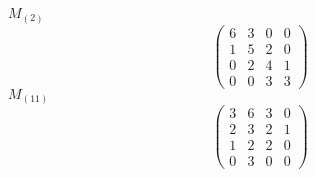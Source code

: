 \documentclass[12pt,reqno]{amsart}
\begin{document}
\Large
$M_{(2)}$                             $$ \begin{pmatrix} 
                           6 & 3 & 0 & 0 \\[6pt]
                           1 & 5 & 2 & 0 \\[6pt]
                           0 & 2 & 4 & 1 \\[6pt]
                             0 & 0 & 3 & 3
                              \end{pmatrix} $$ 
$M_{(11)}$                             $$ \begin{pmatrix} 
                           3 & 6 & 3 & 0 \\[6pt]
                           2 & 3 & 2 & 1 \\[6pt]
                           1 & 2 & 2 & 0 \\[6pt]
                             0 & 3 & 0 & 0
                              \end{pmatrix} $$ 
\end{document}
